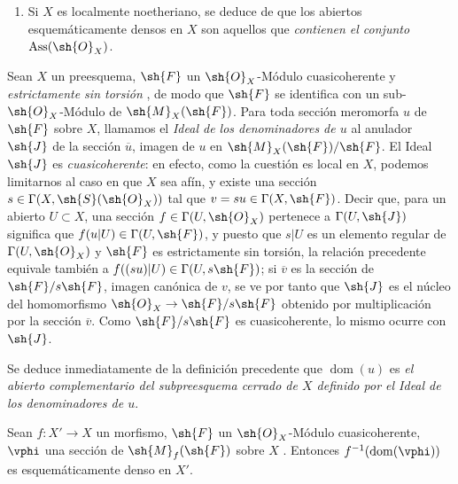\begin{remarks}[20.2.13]
\begin{enumerate}[label=(\roman*)]
  Queda por dar un ejemplo de un anillo $A$ que tenga las propiedades precedentes.
  Basta considerar un anillo local íntegro $B$ de dimensión $\geq2$ y de cuerpo residual $k$, y tomar $A=B\oplus k$ con la ley de multiplicación $(b,x)(b',x')=(bb',bx'+b'x)$.

  \item Si $X$ es localmente noetheriano, se deduce de  que los abiertos esquemáticamente densos en $X$ son aquellos que \emph{contienen el conjunto} $\operatorname{Ass}(\sh{O}_X)$.
\end{enumerate}
\end{remarks}

\begin{env}[20.2.14]
\label{IV.20.2.14}
Sean $X$ un preesquema, $\sh{F}$ un $\sh{O}_X$-Módulo cuasicoherente y \emph{estrictamente sin torsión} , de modo que $\sh{F}$ se identifica con un sub-$\sh{O}_X$-Módulo de $\sh{M}_X(\sh{F})$.
Para toda sección meromorfa $u$ de $\sh{F}$ sobre $X$, llamamos el \emph{Ideal de los denominadores de $u$} al anulador $\sh{J}$ de la sección $\overline{u}$, imagen de $u$ en $\sh{M}_X(\sh{F})/\sh{F}$.
El Ideal $\sh{J}$ es \emph{cuasicoherente}: en efecto, como la cuestión es local en $X$, podemos limitarnos al caso en que $X$ sea afín, y existe una sección $s\in\Gamma(X,\sh{S}(\sh{O}_X))$ tal que $v=su\in\Gamma(X,\sh{F})$.
Decir que, para un abierto $U\subset X$, una sección $f\in\Gamma(U,\sh{O}_X)$ pertenece a $\Gamma(U,\sh{J})$ significa que $f(u|U)\in\Gamma(U,\sh{F})$, y puesto que $s|U$ es un elemento regular de $\Gamma(U,\sh{O}_X)$ y $\sh{F}$ es estrictamente sin torsión, la relación precedente equivale también a $f((su)|U)\in\Gamma(U,s\sh{F})$; si $\overline{v}$ es la sección de $\sh{F}/s\sh{F}$, imagen canónica de $v$, se ve por tanto que $\sh{J}$ es el núcleo del homomorfismo $\sh{O}_X\to\sh{F}/s\sh{F}$ obtenido por multiplicación por la sección $\overline{v}$.
Como $\sh{F}/s\sh{F}$ es cuasicoherente, lo mismo ocurre con $\sh{J}$.

Se deduce inmediatamente de la definición precedente que $\operatorname{dom}(u)$ es \emph{el abierto complementario del subpreesquema cerrado de $X$ definido por el Ideal de los denominadores de $u$}.
\end{env}

\begin{proposition}[20.2.15]
\label{IV.20.2.15}
Sean $f:X'\to X$ un morfismo, $\sh{F}$ un $\sh{O}_X$-Módulo cuasicoherente, $\vphi$ una sección de $\sh{M}_f(\sh{F})$ sobre $X$ .
Entonces $f^{-1}(\operatorname{dom}(\vphi))$ es esquemáticamente denso en $X'$.
\end{proposition}

